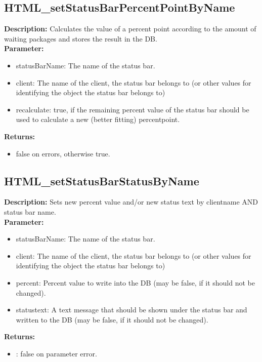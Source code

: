 \subsection{HTML\_setStatusBarPercentPointByName}
\textbf{Description:} Calculates the value of a percent point according to the amount of waiting packages and stores the result in the DB.\\
\textbf{Parameter:}
\begin{itemize}
\item statusBarName: The name of the status bar.
\item client: The name of the client, the status bar belongs to (or other values for identifying the object the status bar belongs to)
\item recalculate: true, if the remaining percent value of the status bar should be used to calculate a new (better fitting) percentpoint.
\end{itemize}
\textbf{Returns:}
\begin{itemize}
\item false on errors, otherwise true.
\end{itemize}

\subsection{HTML\_setStatusBarStatusByName}
\textbf{Description:} Sets new percent value and/or new status text by clientname AND status bar name.\\
\textbf{Parameter:}
\begin{itemize}
\item statusBarName: The name of the status bar.
\item client: The name of the client, the status bar belongs to (or other values for identifying the object the status bar belongs to)
\item percent: Percent value to write into the DB (may be false, if it should not be changed).
\item statustext: A text message that should be shown under the status bar and written to the DB (may be false, if it should not be changed).
\end{itemize}
\textbf{Returns:}
\begin{itemize}
\item : false on parameter error.
\end{itemize}

